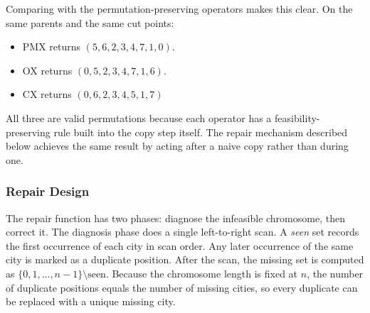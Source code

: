 Comparing with the permutation-preserving operators makes this
clear. On the same parents and the same cut points:

\begin{itemize}
	\item PMX returns $(5,6,2,3,4,7,1,0)$.
	\item OX returns $(0,5,2,3,4,7,1,6)$.
	\item CX returns $(0,6,2,3,4,5,1,7)$
\end{itemize}


All three are valid permutations because
each operator has a feasibility-preserving rule built into the copy step
itself. The repair mechanism described below achieves the same
result by acting after a naive copy rather than during one.

\subsubsection{Repair Design}
\label{T2:RepairDesign}
The repair function has two phases: diagnose the infeasible chromosome,
then correct it. The diagnosis phase does a single left-to-right scan.
A \emph{seen} set records the first occurrence of each city in scan
order. Any later occurrence of the same city is marked as a duplicate
position. After the scan, the missing set is computed as
$\{0, 1, \ldots, n-1\} \setminus \mathrm{seen}$. Because the chromosome
length is fixed at $n$, the number of duplicate positions equals the
number of missing cities, so every duplicate can be replaced with a
unique missing city.

